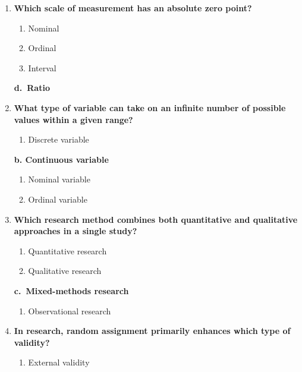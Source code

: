 \documentclass[
  letterpaper,
  DIV=11,
  numbers=noendperiod]{scrreprt}
\providecommand{\tightlist}{%
  \setlength{\itemsep}{0pt}\setlength{\parskip}{0pt}}
\begin{document}
\begin{enumerate}
\def\labelenumi{\arabic{enumi}.}
\item
  \textbf{Which scale of measurement has an absolute zero point?}

  \begin{enumerate}
  \def\labelenumii{\alph{enumii}.}
  \item
    Nominal
  \item
    Ordinal
  \item
    Interval
  \end{enumerate}

  \textbf{d.~Ratio}
\item
  \textbf{What type of variable can take on an infinite number of
  possible values within a given range?}

  \begin{enumerate}
  \def\labelenumii{\alph{enumii}.}
  \tightlist
  \item
    Discrete variable
  \end{enumerate}

  \textbf{b. Continuous variable}

  \begin{enumerate}
  \def\labelenumii{\alph{enumii}.}
  \setcounter{enumii}{2}
  \item
    Nominal variable
  \item
    Ordinal variable
  \end{enumerate}
\item
  \textbf{Which research method combines both quantitative and
  qualitative approaches in a single study?}

  \begin{enumerate}
  \def\labelenumii{\alph{enumii}.}
  \item
    Quantitative research
  \item
    Qualitative research
  \end{enumerate}

  \textbf{c.~Mixed-methods research}

  \begin{enumerate}
  \def\labelenumii{\alph{enumii}.}
  \setcounter{enumii}{3}
  \tightlist
  \item
    Observational research
  \end{enumerate}
\item
  \textbf{In research, random assignment primarily enhances which type
  of validity?}

  \begin{enumerate}
  \def\labelenumii{\alph{enumii}.}
  \tightlist
  \item
    External validity
  \end{enumerate}


\end{enumerate}
\end{document}
